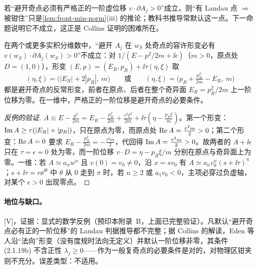 若“避开奇点必须有严格正的一阶虚位移 $v\cdot\partial A_j>0$”成立，则“有 Landau 点 $\Rightarrow$ 被钳住”只是\cref{lem:front-min-norm}(iii) 的推论；教科书推导常默认这一点。下一命题说明它不成立，这正是 Collins 证明的困难所在。

\begin{proposition}\label{prop:front-anomalous}
在两个或更多实积分维数中，“避开 $A_j$ 在 $w_S$ 处奇点的容许形变必有 $v(w_S)\cdot\partial A_j(w_S)>0$”不成立：对 $1/(E-p^2/2m+\ii\epsilon)$（$m>0$，原点处 $D=(1,0)$），形变 $(E,p)=(E_R,p_R)+\ii\tau(\eta,\xi)$ 取
\begin{equation}\label{eq:front-anomalous}
(\eta,\xi)=\bigl(|E_R|+2|p_R|,\ m\bigr)\qquad\text{或}\qquad(\eta,\xi)=\bigl(p_R+\tfrac{p_R^2}{2m}-E_R,\ m\bigr)
\end{equation}
都是避开奇点的反常形变，前者在原点、后者在整个奇异面 $E_R=p_R^2/2m$ 上一阶位移为零\cite[附录~B.1]{Collins:2020euz}。在一维中，严格正的一阶位移是避开奇点的必要条件\cite[附录~B.2]{Collins:2020euz}。
\end{proposition}

\begin{proof}[反例的验证]
$A\equiv E-\frac{p^2}{2m}=E_R-\frac{p_R^2}{2m}+\frac{\tau^2\xi^2}{2m}+\ii\tau(\eta-\frac{p_R\xi}{m})$。第一个形变：$\operatorname{Im} A\ge\tau(|E_R|+|p_R|)$，只在原点为零，而原点处 $\operatorname{Re} A=\frac{\tau^2m}2>0$；第二个形变：$\operatorname{Re} A=0$ 要求 $E_R-\frac{p_R^2}{2m}=-\frac{\tau^2m}2$，代回得 $\operatorname{Im} A=\frac{\tau^3m}2>0$。故两者的 $A+\ii\epsilon$ 只在 $\tau=\epsilon=0$ 处为零，而一阶位移 $v\cdot D=\eta-p_R\xi/m$ 分别在原点与奇异面上为零。一维：若 $A\simeq a_nw^n$ 且 $v(0)=v_0\ne0$，沿 $x=sv_0$ 有 $A\simeq a_nv_0^n(s+\ii\tau)^n$；$s+\ii\tau=r\ee^{\ii\theta}$ 中 $\theta$ 从 $0$ 走到 $\pi$ 时，若 $n\ge2$ 或 $a_1v_0<0$，主项必穿过负虚轴，对某个 $\epsilon>0$ 出现零点。
\end{proof}

\paragraph{地位与缺口。}[V]，证据：显式的数学反例（预印本\cite{Collins:2020euz}附录~B，上面已完整验证）。凡默认“避开奇点必有正的一阶位移”的 Landau 判据推导都不完整；据 Collins 的解读\cite[第~IV~节]{Collins:2020euz}，Eden 等人\cite[第~2.1~节]{EdenEtAl1966}沿“法向”形变（没有度规时法向无定义）并默认一阶位移非零，其条件 (2.1.19b) 不含正性 $\lambda_j\ge0$——作为一般复奇点的必要条件是对的，对物理区钳夹则不充分。误差类型：不适用。

